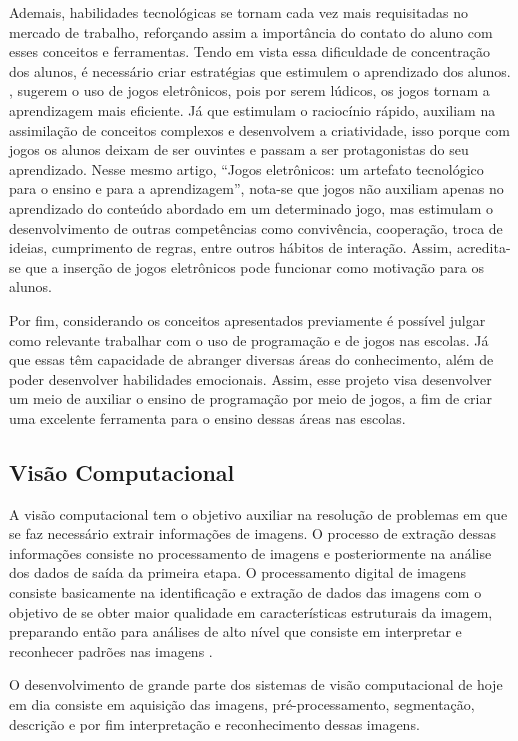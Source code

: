 Ademais, habilidades tecnológicas se tornam cada vez mais requisitadas no mercado de trabalho, reforçando assim a importância do contato do aluno com esses conceitos e ferramentas. Tendo em vista essa dificuldade de concentração dos alunos, é necessário criar estratégias que estimulem o aprendizado dos alunos. , sugerem o uso de jogos eletrônicos, pois por serem lúdicos, os jogos tornam a aprendizagem mais eficiente. Já que estimulam o raciocínio rápido, auxiliam na assimilação de conceitos complexos e desenvolvem a criatividade, isso porque com jogos os alunos deixam de ser ouvintes e passam a ser protagonistas do seu aprendizado. Nesse mesmo artigo, “Jogos eletrônicos: um artefato tecnológico para o ensino e para a aprendizagem”, nota-se que jogos não auxiliam apenas no aprendizado do conteúdo abordado em um determinado jogo, mas estimulam o desenvolvimento de outras competências como convivência, cooperação, troca de ideias, cumprimento de regras, entre outros hábitos de interação. Assim, acredita-se que a inserção de jogos eletrônicos pode funcionar como motivação para os alunos.

Por fim, considerando os conceitos apresentados previamente é possível julgar como
relevante trabalhar com o uso de programação e de jogos nas escolas. Já que essas têm capacidade de abranger diversas áreas do conhecimento, além de poder desenvolver habilidades emocionais.
Assim, esse projeto visa desenvolver um meio de auxiliar o ensino de programação por meio de jogos, a fim de criar uma excelente ferramenta para o ensino dessas áreas nas escolas.

\subsection{Visão Computacional}


A visão computacional tem o objetivo auxiliar na resolução de problemas em que se faz necessário extrair informações de imagens. O processo de extração dessas informações consiste no processamento de imagens e posteriormente na análise dos dados de saída da primeira etapa. O processamento digital de imagens consiste basicamente na identificação e extração de dados das imagens com o objetivo de se obter maior qualidade em características estruturais da imagem, preparando então para análises de alto nível que consiste em interpretar e reconhecer padrões nas imagens \cite{schwartz_2007}.

O desenvolvimento de grande parte dos sistemas de visão computacional de hoje em dia consiste em aquisição das imagens, pré-processamento, segmentação, descrição e por fim interpretação e reconhecimento dessas imagens.



